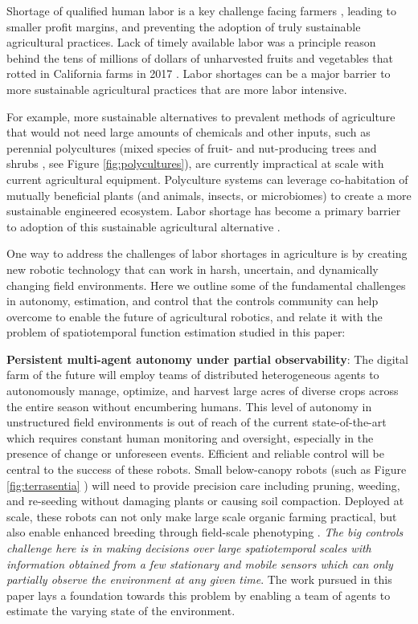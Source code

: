 \documentclass[letterpaper,12pt,peerreviewca,draftcls]{IEEEtran}
\begin{document}
Shortage of qualified human labor is a key challenge facing farmers \cite{richards2018immigration,hertz2013there}, leading to smaller profit margins, and preventing the adoption of truly sustainable agricultural practices. Lack of timely available labor was a principle reason behind the tens of millions of dollars of unharvested fruits and vegetables that rotted in California farms in 2017 \cite{guthman2017paradoxes,RN4026}.  Labor shortages can be a major barrier to more sustainable agricultural practices that are more labor intensive.

For example, more sustainable alternatives to prevalent methods of agriculture that would not need large amounts of chemicals and other inputs, such as perennial polycultures (mixed species of fruit- and nut-producing trees and shrubs \cite{lovell2017temperate}, see Figure \ref{fig:polycultures}), are currently impractical at scale with current agricultural equipment. Polyculture systems can leverage co-habitation of mutually beneficial plants (and animals, insects, or microbiomes) to create a more sustainable engineered ecosystem. Labor shortage has become a primary barrier to adoption of this sustainable agricultural alternative \cite{RN4017,RN4018}.  


One way to address the challenges of labor shortages in agriculture is by creating new robotic technology that can work in harsh, uncertain, and dynamically changing field environments. 
Here we outline some of the fundamental challenges in autonomy, estimation, and control that the controls community can help overcome to enable the future of agricultural robotics, and relate it with the problem of spatiotemporal function estimation studied in this paper:

\textbf{Persistent multi-agent autonomy under partial observability}:  The digital farm of the future will employ teams of distributed heterogeneous agents to autonomously manage, optimize, and harvest large acres of diverse crops across the entire season without encumbering humans. This level of autonomy in unstructured field environments is out of reach of the current state-of-the-art which requires constant human monitoring and oversight, especially in the presence of change or unforeseen events. Efficient and reliable control will be central to the success of these robots. Small below-canopy robots (such as Figure \ref{fig:terrasentia} \cite{kayacan2018embedded}) will need to provide precision care including pruning, weeding, and re-seeding without damaging plants or causing soil compaction. Deployed at scale, these robots can not only make large scale organic farming practical, but also enable enhanced breeding through  field-scale phenotyping \cite{kayacan2018embedded,mueller2017robotanist,virlet2017field}. \textit{The big controls challenge here is in making decisions over large spatiotemporal scales with information obtained from a few stationary and mobile sensors which can only partially observe the environment at any given time}. The work pursued in this paper lays a foundation towards this problem by enabling a team of agents to estimate the varying state of the environment. 
\end{document}
